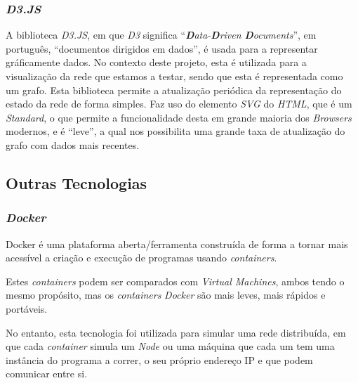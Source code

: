 \subsubsection*{\emph{D3.JS}}
A biblioteca \emph{D3.JS}, em que \emph{D3} significa ``\emph{\textbf{D}ata-\textbf{D}riven \textbf{D}ocuments}'', em português, ``documentos dirigidos em dados'', é usada para a representar gráficamente dados.
No contexto deste projeto, esta é utilizada para a visualização da rede que estamos a testar, sendo que esta é representada como um grafo.
Esta biblioteca permite a atualização periódica da representação do estado da rede de forma simples.
Faz uso do elemento \emph{\acs{SVG}} do \emph{\acs{HTML}}, que é um \emph{Standard}, o que permite a funcionalidade desta em grande maioria dos \emph{Browsers} modernos, e é ``leve'', a qual nos possibilita uma grande taxa de atualização do grafo com dados mais recentes.

\subsection*{Outras Tecnologias}
\label{chap3:outras_tecnologias}
\subsubsection*{\emph{Docker}}

Docker é uma plataforma aberta/ferramenta construída de forma a tornar mais acessível a criação e execução de programas  usando \emph{containers}.


Estes \emph{containers} podem ser comparados com \emph{Virtual Machines}, ambos tendo o mesmo propósito, mas os \emph{containers} \emph{Docker} são mais leves, mais rápidos e portáveis.


No entanto, esta tecnologia foi utilizada para simular uma rede distribuída, em que cada \emph{container} simula um \emph{Node} ou uma máquina que cada um tem uma instância do programa a correr, o seu próprio endereço \acs{IP} e que podem comunicar entre si.






